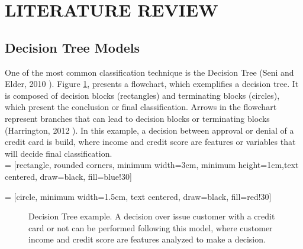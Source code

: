\documentclass[letterpaper, 10 pt, conference]{ieeeconf}  %
\begin{document}
\section{LITERATURE REVIEW}
\subsection{Decision Tree Models}
One of the most common classification technique is the Decision Tree (Seni and Elder, 2010 \cite{Seni2010}). Figure \ref{DT}, presents a flowchart, which exemplifies a decision tree. It is composed of decision blocks (rectangles) and terminating blocks (circles), which present the conclusion or final classification. Arrows in the flowchart represent branches that can lead to decision blocks or terminating blocks (Harrington, 2012 \cite{Harrington2012}). In this example, a decision between approval or denial of a credit card is build, where income and credit score are features or variables that will decide final classification.\\

 = [rectangle, rounded corners, minimum width=3cm, minimum height=1cm,text centered, draw=black, fill=blue!30]

 = [circle, minimum width=1.5cm, text centered, draw=black, fill=red!30]

\begin{figure}[thpb]
\begin{center}
\end{center}
\caption{Decision Tree example. A decision over issue customer with a credit card or not can be performed following this model, where customer income and credit score are features analyzed to make a decision.}
\label{DT}
\end{figure}
\end{document}

